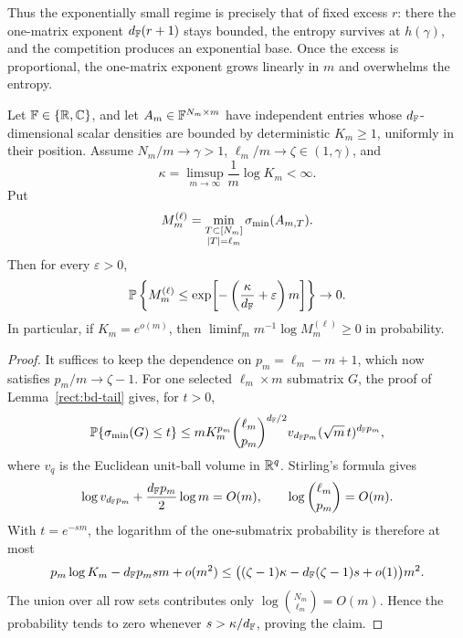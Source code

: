 Thus the exponentially small regime is precisely that of fixed excess \(r\):
there the one-matrix exponent \(d_{\mathbb{F}}(r+1)\) stays bounded, the entropy survives
at \(h(\gamma)\), and the competition produces an exponential base.  Once the
excess is proportional, the one-matrix exponent grows linearly in \(m\) and
overwhelms the entropy.

\begin{proposition}\label{rect:proportional-density-rate}
Let \(\mathbb{F}\in\{\mathbb{R},\mathbb{C}\}\), and let \(A_m\in\mathbb{F}^{N_m\times m}\) have independent
entries whose \(d_{\mathbb{F}}\)-dimensional scalar densities are bounded by deterministic
\(K_m\ge1\), uniformly in their position.  Assume \(N_m/m\to\gamma>1\),
\(\ell_m/m\to\zeta\in(1,\gamma)\), and
\[
  \kappa=\limsup_{m\to\infty}\frac1m\log K_m<\infty .
\]
Put
\[
  M_m^{(\ell)}=\min_{\substack{T\subset[N_m]\\ |T|=\ell_m}}\sigma_{\min}(A_{m,T}).
\]
Then for every \(\varepsilon>0\),
\[
  \mathbb{P}\left\{M_m^{(\ell)}\le
  \exp\!\left[-\left(\frac{\kappa}{d_{\mathbb{F}}}+\varepsilon\right)m\right]\right\}\to0.
\]
In particular, if \(K_m=e^{o(m)}\), then
\(\liminf_m m^{-1}\log M_m^{(\ell)}\ge0\) in probability.
\end{proposition}

\begin{proof}
It suffices to keep the dependence on \(p_m=\ell_m-m+1\), which now satisfies
\(p_m/m\to\zeta-1\).  For one selected \(\ell_m\times m\) submatrix \(G\), the
proof of Lemma~\ref{rect:bd-tail} gives, for \(t>0\),
\[
  \mathbb{P}\{\sigma_{\min}(G)\le t\}
  \le
  m K_m^{p_m}\binom{\ell_m}{p_m}^{d_{\mathbb{F}}/2}
  v_{d_{\mathbb{F}} p_m}(\sqrt m\,t)^{d_{\mathbb{F}} p_m},
\]
where \(v_q\) is the Euclidean unit-ball volume in \(\mathbb{R}^q\).  Stirling's formula
gives
\[
  \log v_{d_{\mathbb{F}} p_m}+\frac{d_{\mathbb{F}} p_m}{2}\log m=O(m),
  \qquad
  \log\binom{\ell_m}{p_m}=O(m).
\]
With \(t=e^{-sm}\), the logarithm of the one-submatrix probability is therefore
at most
\[
  p_m\log K_m-d_{\mathbb{F}} p_m s m+o(m^2)
  \le \bigl((\zeta-1)\kappa-d_{\mathbb{F}}(\zeta-1)s+o(1)\bigr)m^2.
\]
The union over all row sets contributes only
\(\log\binom{N_m}{\ell_m}=O(m)\).  Hence the probability tends to zero whenever
\(s>\kappa/d_{\mathbb{F}}\), proving the claim.
\end{proof}

